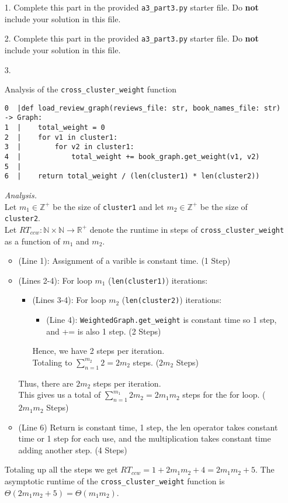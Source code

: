 \documentclass[11pt]{article}
\newcommand{\Z}{\mathbb{Z}}
\begin{document}
\begin{enumerate}

\item[1.]
Complete this part in the provided \texttt{a3\_part3.py} starter file.
Do \textbf{not} include your solution in this file.

\item[2.]
Complete this part in the provided \texttt{a3\_part3.py} starter file.
Do \textbf{not} include your solution in this file.

\item[3.]

\begin{enumerate}
Analysis of the \texttt{cross\_cluster\_weight} function
\begin{verbatim}
0  |def load_review_graph(reviews_file: str, book_names_file: str) -> Graph:
1  |    total_weight = 0
2  |    for v1 in cluster1:
3  |        for v2 in cluster1:
4  |            total_weight += book_graph.get_weight(v1, v2)
5  |
6  |    return total_weight / (len(cluster1) * len(cluster2))
\end{verbatim}
\textit{Analysis.}\\
Let $m_1 \in \Z^+$ be the size of \texttt{cluster1} and let $m_2 \in \Z^+$ be the size of \texttt{cluster2}.\\
Let $RT_{ccw} : \mathbb{N} \times \mathbb{N} \to \mathbb{R}^+$ denote the runtime in steps of \texttt{cross\_cluster\_weight} as a function of $m_1$ and $m_2$.
\begin{itemize}
    \item (Line 1): Assignment of a varible is constant time. (1 Step)
    \item (Lines 2-4): For loop $m_1$ (\texttt{len(cluster1)}) iterations:
    \begin{itemize}
        \item (Lines 3-4): For loop $m_2$ (\texttt{len(cluster2)}) iterations:
        \begin{itemize}
            \item (Line 4): \texttt{WeightedGraph.get\_weight} is constant time so 1 step, and += is also 1 step. (2 Steps)
        \end{itemize}
        Hence, we have 2 steps per iteration.\\
        Totaling to $\displaystyle \sum_{n = 1}^{m_2} 2 = 2m_2$ steps. ($2m_2$ Steps)
    \end{itemize}
    Thus, there are $2m_2$ steps per iteration.\\
    This gives us a total of $\displaystyle \sum_{n = 1}^{m_1} 2m_2 = 2 m_1 m_2$ steps for the for loop. ($2 m_1 m_2$ Steps)
    \item (Line 6) Return is constant time, 1 step, the len operator takes constant time or 1 step for each use, 
    and the multiplication takes constant time adding another step. (4 Steps)  
\end{itemize} 
Totaling up all the steps we get $RT_{ccw} = 1 + 2 m_1 m_2 + 4 = 2 m_1 m_2 + 5$.  The asymptotic runtime of 
the \texttt{cross\_cluster\_weight} function is $\Theta(2 m_1 m_2 + 5) = \Theta(m_1m_2)$.



\end{enumerate}
\end{enumerate}
\end{document}
